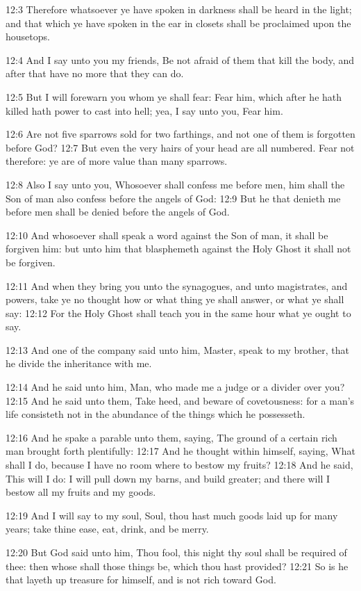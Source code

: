 12:3 Therefore whatsoever ye have spoken in darkness shall be heard in
the light; and that which ye have spoken in the ear in closets shall
be proclaimed upon the housetops.

12:4 And I say unto you my friends, Be not afraid of them that kill
the body, and after that have no more that they can do.

12:5 But I will forewarn you whom ye shall fear: Fear him, which after
he hath killed hath power to cast into hell; yea, I say unto you, Fear
him.

12:6 Are not five sparrows sold for two farthings, and not one of them
is forgotten before God?  12:7 But even the very hairs of your head
are all numbered. Fear not therefore: ye are of more value than many
sparrows.

12:8 Also I say unto you, Whosoever shall confess me before men, him
shall the Son of man also confess before the angels of God: 12:9 But
he that denieth me before men shall be denied before the angels of
God.

12:10 And whosoever shall speak a word against the Son of man, it
shall be forgiven him: but unto him that blasphemeth against the Holy
Ghost it shall not be forgiven.

12:11 And when they bring you unto the synagogues, and unto
magistrates, and powers, take ye no thought how or what thing ye shall
answer, or what ye shall say: 12:12 For the Holy Ghost shall teach you
in the same hour what ye ought to say.

12:13 And one of the company said unto him, Master, speak to my
brother, that he divide the inheritance with me.

12:14 And he said unto him, Man, who made me a judge or a divider over
you?  12:15 And he said unto them, Take heed, and beware of
covetousness: for a man's life consisteth not in the abundance of the
things which he possesseth.

12:16 And he spake a parable unto them, saying, The ground of a
certain rich man brought forth plentifully: 12:17 And he thought
within himself, saying, What shall I do, because I have no room where
to bestow my fruits?  12:18 And he said, This will I do: I will pull
down my barns, and build greater; and there will I bestow all my
fruits and my goods.

12:19 And I will say to my soul, Soul, thou hast much goods laid up
for many years; take thine ease, eat, drink, and be merry.

12:20 But God said unto him, Thou fool, this night thy soul shall be
required of thee: then whose shall those things be, which thou hast
provided?  12:21 So is he that layeth up treasure for himself, and is
not rich toward God.

